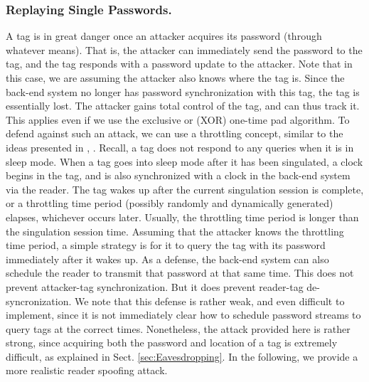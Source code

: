 \subsubsection{Replaying Single Passwords.}
\label{sec:Replaying_Single_Passwords}
A tag is in great danger once an attacker acquires its password (through whatever means).  That is, the attacker can immediately send the password to the tag, and the tag responds with a password update to the attacker.  Note that in this case, we are assuming the attacker also knows where the tag is.  Since the back-end system no longer has password synchronization with this tag, the tag is essentially lost.  The attacker gains total control of the tag, and can thus track it.  This applies even if we use the exclusive or (XOR) one-time pad algorithm.  To defend against such an attack, we can use a throttling concept, similar to the ideas presented in \cite{journal:Langheinrich01}, \cite{conf:Juels01}.  Recall, a tag does not respond to any queries when it is in sleep mode.  When a tag goes into sleep mode after it has been singulated, a clock begins in the tag, and is also synchronized with a clock in the back-end system via the reader.  The tag wakes up after the current singulation session is complete, or a throttling time period (possibly randomly and dynamically generated) elapses, whichever occurs later.  Usually, the throttling time period is longer than the singulation session time.  Assuming that the attacker knows the throttling time period, a simple strategy is for it to query the tag with its password immediately after it wakes up.  As a defense, the back-end system can also schedule the reader to transmit that password at that same time.  This does not prevent attacker-tag synchronization.  But it does prevent reader-tag de-syncronization.  We note that this defense is rather weak, and even difficult to implement, since it is not immediately clear how to schedule password streams to query tags at the correct times.  Nonetheless, the attack provided here is rather strong, since acquiring both the password and location of a tag is extremely difficult, as explained in Sect. \ref{sec:Eavesdropping}.  In the following, we provide a more realistic reader spoofing attack.

